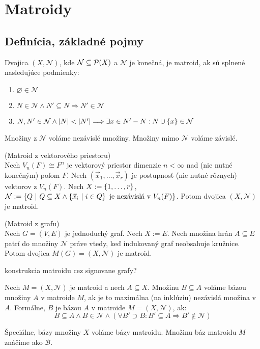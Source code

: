 \chapter{Matroidy}

\section{Definícia, základné pojmy}

\begin{definition}

Dvojica $(X, \mathcal{N})$, kde $\mathcal{N} \subseteq \mathcal{P}(X)$ a $\mathcal{N}$ je konečná, je matroid, ak sú splnené nasledujúce podmienky:
\begin{enumerate}
    \item $\varnothing \in \mathcal{N}$
    \item $N \in \mathcal{N} \wedge N' \subseteq N \Longrightarrow N' \in \mathcal{N}$
    \item $N, N' \in \mathcal{N} \wedge \left|N\right| < \left|N'\right| \Longrightarrow \exists x \in N' - N: N \cup \left\{x\right\} \in \mathcal{N}$
\end{enumerate}

Množiny z $\mathcal{N}$ voláme nezávislé množiny. Množiny mimo $\mathcal{N}$ voláme závislé.
\end{definition}

\begin{theorem}{(Matroid z vektorového priestoru)}\\
Nech $V_n(F) \cong F^n$ je vektorový priestor dimenzie $n < \infty$ nad (nie nutné konečným) poľom $F$. 
Nech $(\vec{x}_1, \ldots, \vec{x}_r)$ je postupnosť (nie nutné rôznych) vektorov z $V_n(F)$.
Nech $X := \left\{1, \ldots, r\right\}$, $\mathcal{N} := \left\{Q ~|~ Q \subseteq X \wedge \left\{\vec{x}_i ~|~ i \in Q\right\} \text{ je nezávislá v } V_n(F) \right\}$.
Potom dvojica $(X, \mathcal{N})$ je matroid.
\end{theorem}

\begin{theorem}{(Matroid z grafu)}\\
Nech $G = (V, E)$ je jednoduchý graf. Nech $X := E$. Nech množina hrán $A \subseteq E$ patrí do množiny $\mathcal{N}$ práve vtedy, keď
indukovaný graf neobsahuje kružnice. Potom dvojica $M(G) = (X, \mathcal{N})$ je matroid.
\end{theorem}

\TODO konstrukcia matroidu cez signovane grafy?

\begin{definition}
Nech $M = (X, \mathcal{N})$ je matroid a nech $A \subseteq X$. Množinu $B \subseteq A$ voláme bázou množiny $A$ v matroide $M$, ak 
je to maximálna (na inklúziu) nezávislá množina v $A$. Formálne, $B$ je bázou $A$ v matroide $M=(X, \mathcal{N})$, ak:
$$B \subseteq A \wedge B \in \mathcal{N} \wedge \left( \forall B' \supset B: B' \subseteq A \Longrightarrow B' \not\in\mathcal{N} \right)$$

Špeciálne, bázy množiny $X$ voláme bázy matroidu. Množinu báz matroidu $M$ znáčime ako $\mathcal{B}$.
\end{definition}

